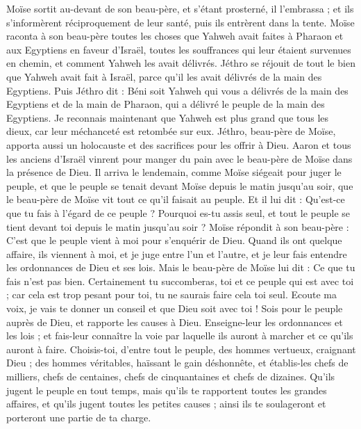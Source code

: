 \begin{multicols}{2}
Moïse sortit au-devant de son beau-père, et s'étant prosterné, il l’embrassa ; et ils s’informèrent réciproquement de leur santé, puis ils entrèrent dans la tente.
Moïse raconta à son beau-père toutes les choses que Yahweh avait faites à Pharaon et aux Egyptiens en faveur d'Israël, toutes les souffrances qui leur étaient survenues en chemin, et comment Yahweh les avait délivrés.
Jéthro se réjouit de tout le bien que Yahweh avait fait à Israël, parce qu'il les avait délivrés de la main des Egyptiens.
Puis Jéthro dit : Béni soit Yahweh qui vous a délivrés de la main des Egyptiens et de la main de Pharaon, qui a délivré le peuple de la main des Egyptiens.
Je reconnais maintenant que Yahweh est plus grand que tous les dieux, car leur méchanceté est retombée sur eux.
Jéthro, beau-père de Moïse, apporta aussi un holocauste et des sacrifices pour les offrir à Dieu. Aaron et tous les anciens d'Israël vinrent pour manger du pain avec le beau-père de Moïse dans la présence de Dieu.
Il arriva le lendemain, comme Moïse siégeait pour juger le peuple, et que le peuple se tenait devant Moïse depuis le matin jusqu'au soir,
que le beau-père de Moïse vit tout ce qu'il faisait au peuple. Et il lui dit : Qu'est-ce que tu fais à l'égard de ce peuple ? Pourquoi es-tu assis seul, et tout le peuple se tient devant toi depuis le matin jusqu'au soir ?
Moïse répondit à son beau-père : C'est que le peuple vient à moi pour s'enquérir de Dieu.
Quand ils ont quelque affaire, ils viennent à moi, et je juge entre l'un et l'autre, et je leur fais entendre les ordonnances de Dieu et ses lois.
Mais le beau-père de Moïse lui dit : Ce que tu fais n'est pas bien.
Certainement tu succomberas, toi et ce peuple qui est avec toi ; car cela est trop pesant pour toi, tu ne saurais faire cela toi seul.
Ecoute ma voix, je vais te donner un conseil et que Dieu soit avec toi ! Sois pour le peuple auprès de Dieu, et rapporte les causes à Dieu.
Enseigne-leur les ordonnances et les lois ; et fais-leur connaître la voie par laquelle ils auront à marcher et ce qu'ils auront à faire.
Choisis-toi, d'entre tout le peuple, des hommes vertueux, craignant Dieu ; des hommes véritables, haïssant le gain déshonnête, et établis-les chefs de milliers, chefs de centaines, chefs de cinquantaines et chefs de dizaines.
Qu'ils jugent le peuple en tout temps, mais qu'ils te rapportent toutes les grandes affaires, et qu'ils jugent toutes les petites causes ; ainsi ils te soulageront et porteront une partie de ta charge.

\end{multicols}
